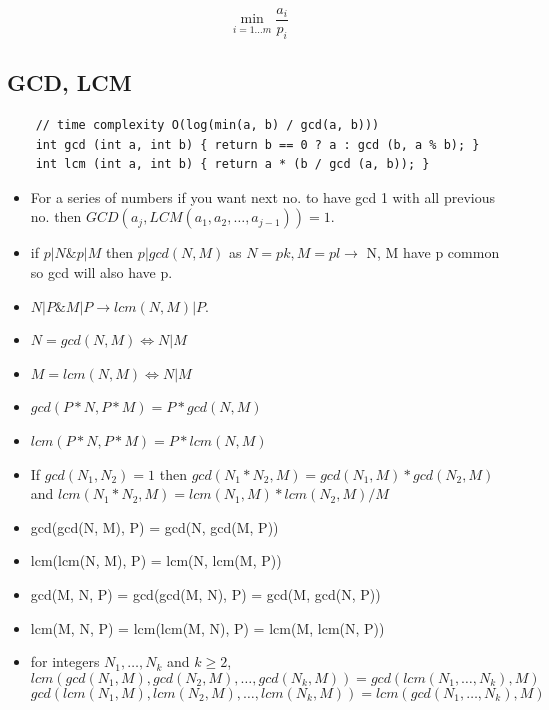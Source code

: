 \documentclass[8pt, a4paper, oneside, twocolumn]{extarticle}
\begin{document}
$$\min_ {i=1 \ldots m} \dfrac{a_i}{p_i}$$
\subsection{GCD, LCM}
\begin{verbatim}
    // time complexity O(log(min(a, b) / gcd(a, b)))
    int gcd (int a, int b) { return b == 0 ? a : gcd (b, a % b); }
    int lcm (int a, int b) { return a * (b / gcd (a, b)); }
\end{verbatim}
\begin{itemize}
    \item For a series of numbers if you want next no. to have gcd 1 with all previous no. then $GCD(a_j, LCM(a_1, a_2, \dots, a_{j - 1})) = 1$.
    \item if $p|N \& p|M$ then $p|gcd(N, M)$ as $N = pk, M = pl \rightarrow$ N, M have p common so gcd will also have p.
    \item $N|P \& M|P \rightarrow lcm(N, M)|P$.
    \item $N = gcd(N, M) \Leftrightarrow N|M$
    \item $M = lcm(N, M) \Leftrightarrow N|M$
    \item $gcd(P*N, P*M) = P*gcd(N, M)$
    \item $lcm(P*N, P*M) = P*lcm(N, M)$
    \item If $gcd(N_1, N_2) = 1$ then $gcd(N_1 * N_2, M) = gcd(N_1, M) * gcd(N_2, M)$ and $lcm(N_1*N_2, M) = lcm(N_1, M)*lcm(N_2, M)/M$
    \item gcd(gcd(N, M), P) = gcd(N, gcd(M, P))
    \item lcm(lcm(N, M), P) = lcm(N, lcm(M, P))
    \item gcd(M, N, P) = gcd(gcd(M, N), P) = gcd(M, gcd(N, P))
    \item lcm(M, N, P) = lcm(lcm(M, N), P) = lcm(M, lcm(N, P))
    \item for integers $N_1, \dots, N_k$ and $k \geq 2$, 
    $$lcm(gcd(N_1, M), gcd(N_2, M), \dots, gcd(N_k, M)) = gcd(lcm(N_1, \dots, N_k), M)$$
    $$gcd(lcm(N_1, M), lcm(N_2, M), \dots, lcm(N_k, M)) = lcm(gcd(N_1, \dots, N_k), M)$$
\end{itemize}
\end{document}
